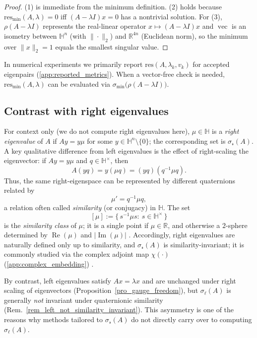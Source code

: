 \documentclass[preprint,12pt]{elsarticle}  %
\theoremstyle{definition}
\theoremstyle{definition}
\theoremstyle{definition}
\theoremstyle{definition}
\theoremstyle{definition}
\theoremstyle{remark}
\theoremstyle{remark}
\theoremstyle{remark}
\newcommand{\err}{\ensuremath{ \mathscr{r} }}
\renewcommand{\Re}{\operatorname{Re}}
\renewcommand{\Im}{\operatorname{Im}}
\newcommand{\RR}{\mathbb{R}}
\newcommand{\HH}{\mathbb{H}}
\DeclareMathOperator{\rvec}{vec}
\begin{document}
\begin{proof}
(1) is immediate from the minimum definition. (2) holds because $\mathrm{res}_{\min}(A,\lambda)=0$ iff
$(A-\lambda I)x=0$ has a nontrivial solution. For (3), $\rho(A-\lambda I)$ represents the real-linear operator
$x\mapsto (A-\lambda I)x$ and $\rvec$ is an isometry between $\HH^n$ (with $\|\cdot\|_2$) and $\RR^{4n}$ (Euclidean norm),
so the minimum over $\|x\|_2=1$ equals the smallest singular value.
\end{proof}

In numerical experiments we primarily report $\mathrm{res}(A,\lambda_k,v_k)$ for accepted eigenpairs
(\ref{app:reported_metrics}). When a vector-free check is needed, $\mathrm{res}_{\min}(A,\lambda)$ can be evaluated via
$\sigma_{\min}\bigl(\rho(A-\lambda I)\bigr)$.

\subsection{Contrast with right eigenvalues}
\label{subsec_left_right_contrast}
For context only (we do not compute right eigenvalues here), $\mu\in\HH$ is a \emph{right eigenvalue} of $A$
if $Ay=y\mu$ for some $y\in\HH^n\setminus\{0\}$; the corresponding set is $\sigma_\err(A)$. A key qualitative difference from left eigenvalues is the effect of right-scaling the eigenvector: if $Ay=y\mu$ and $q\in\HH^\times$, then
\[
A(yq)=y(\mu q)=(yq)(q^{-1}\mu q).
\]
Thus, the same right-eigenspace can be represented by different quaternions related by
\[
\mu' = q^{-1}\mu q,
\]
a relation often called \emph{similarity} (or conjugacy) in $\HH$. The set
\[
[\mu]:=\{\,s^{-1}\mu s:\ s\in\HH^\times\,\}
\]
is the \emph{similarity class} of $\mu$; it is a single point if $\mu\in\RR$, and otherwise a $2$-sphere determined by $\Re(\mu)$ and $|\Im(\mu)|$ \cite{Zhang1997,Rodman2014}. Accordingly, right eigenvalues are naturally defined only up to similarity, and $\sigma_\err(A)$ is similarity-invariant; it is commonly studied via the complex adjoint map $\chi(\cdot)$
(\ref{app:complex_embedding}) \cite{Zhang1997,Zhang2007,Rodman2014}.

By contrast, left eigenvalues satisfy $Ax=\lambda x$ and are unchanged under right scaling of eigenvectors (Proposition~\ref{pro_gauge_freedom}), but $\sigma_\ell(A)$ is generally \emph{not} invariant under quaternionic similarity
(Rem.~\ref{rem_left_not_similarity_invariant}). This asymmetry is one of the reasons why methods tailored to $\sigma_\err(A)$ do not directly carry over to computing $\sigma_\ell(A)$.
\end{document}
